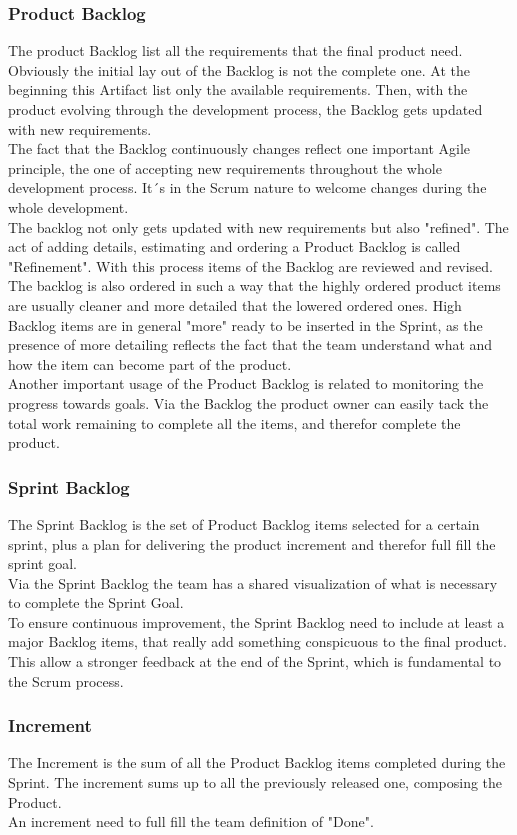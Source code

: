 \documentclass[../main.tex]{subfiles}
\begin{document}
\subsubsection{Product Backlog}
The product Backlog list all the requirements that the final product need. Obviously the initial lay out of the Backlog is not the complete one. At the beginning this Artifact list only the available requirements. Then, with the product evolving through the development process, the Backlog gets updated with new requirements.\\
The fact that the Backlog continuously changes reflect one important Agile principle, the one of accepting new requirements throughout the whole development process. It´s in the Scrum nature to welcome changes during the whole development.\\
The backlog not only gets updated with new requirements but also "refined". The act of adding details, estimating and ordering a Product Backlog is called "Refinement". With this process items of the Backlog are reviewed and revised. The backlog is also ordered in such a way that the highly ordered product items are usually cleaner and more detailed that the lowered ordered ones. High Backlog items are in general "more" ready to be inserted in the Sprint, as the presence of more detailing reflects the fact that the team understand what and how the item can become part of the product. \\
Another important usage of the Product Backlog is related to monitoring the progress towards goals. Via the Backlog the product owner can easily tack the total work remaining to complete all the items, and therefor complete the product. 
\subsubsection{Sprint Backlog}
The Sprint Backlog is the set of Product Backlog items selected for a certain sprint, plus a plan for delivering the product increment and therefor full fill the sprint goal.\\
Via the Sprint Backlog the team has a shared visualization of what is necessary to complete the Sprint Goal.\\
To ensure continuous improvement, the Sprint Backlog need to include at least a major Backlog items, that really add something conspicuous to the final product. This allow a stronger feedback at the end of the Sprint, which is fundamental to the Scrum process. 
\subsubsection{Increment}
The Increment is the sum of all the Product Backlog items completed during the Sprint. The increment sums up to all the previously released one, composing the Product.\\
An increment need to full fill the team definition of "Done".
\end{document}

